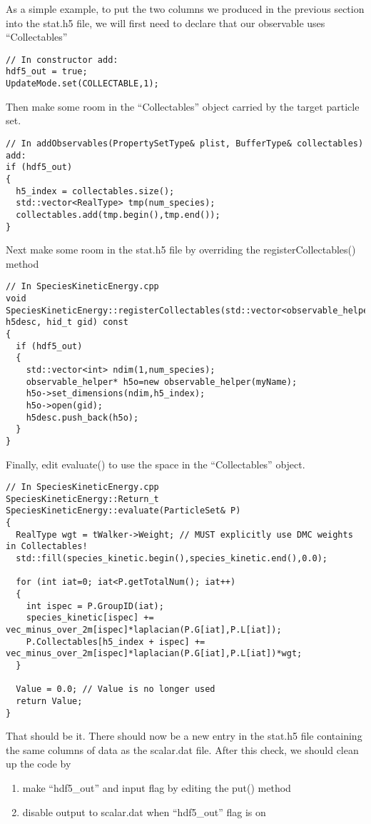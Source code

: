 \documentclass[aps,prl,preprint]{revtex4-1}
\begin{document}
As a simple example, to put the two columns we produced in the previous section into the stat.h5 file, we will first need to declare that our observable uses ``Collectables''
\begin{lstlisting}
// In constructor add: 
hdf5_out = true;
UpdateMode.set(COLLECTABLE,1);
\end{lstlisting}
Then make some room in the ``Collectables'' object carried by the target particle set.
\begin{lstlisting}
// In addObservables(PropertySetType& plist, BufferType& collectables) add:
if (hdf5_out)
{
  h5_index = collectables.size();
  std::vector<RealType> tmp(num_species);
  collectables.add(tmp.begin(),tmp.end());
}
\end{lstlisting}
Next make some room in the stat.h5 file by overriding the registerCollectables() method
\begin{lstlisting}
// In SpeciesKineticEnergy.cpp
void SpeciesKineticEnergy::registerCollectables(std::vector<observable_helper*>& h5desc, hid_t gid) const
{
  if (hdf5_out)
  {
    std::vector<int> ndim(1,num_species);
    observable_helper* h5o=new observable_helper(myName);
    h5o->set_dimensions(ndim,h5_index);
    h5o->open(gid);
    h5desc.push_back(h5o);
  }
}
\end{lstlisting}
Finally, edit evaluate() to use the space in the ``Collectables'' object.
\begin{lstlisting}
// In SpeciesKineticEnergy.cpp
SpeciesKineticEnergy::Return_t SpeciesKineticEnergy::evaluate(ParticleSet& P)
{
  RealType wgt = tWalker->Weight; // MUST explicitly use DMC weights in Collectables!
  std::fill(species_kinetic.begin(),species_kinetic.end(),0.0);

  for (int iat=0; iat<P.getTotalNum(); iat++)
  {
    int ispec = P.GroupID(iat);
    species_kinetic[ispec] += vec_minus_over_2m[ispec]*laplacian(P.G[iat],P.L[iat]);
    P.Collectables[h5_index + ispec] += vec_minus_over_2m[ispec]*laplacian(P.G[iat],P.L[iat])*wgt;
  }

  Value = 0.0; // Value is no longer used
  return Value;
}
\end{lstlisting}
That should be it. There should now be a new entry in the stat.h5 file containing the same columns of data as the scalar.dat file. After this check, we should clean up the code by
\begin{enumerate}
\item make ``hdf5\_out'' and input flag by editing the put() method
\item disable output to scalar.dat when ``hdf5\_out'' flag is on
\end{enumerate}
\end{document}
